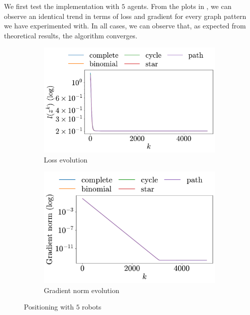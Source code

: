 \documentclass[a4paper,11pt,oneside]{book}
\begin{document}
We first test the implementation with $5$ agents. From the plots in , we can observe an identical trend in terms of loss and gradient for every graph pattern we have experimented with. In all cases, we can observe that, as expected from theoretical results, the algorithm converges.

\begin{figure}[h!]
      \centering
      \begin{subfigure}[h]{0.4\linewidth}
            \centering
            \includegraphics[width=\linewidth]{./figs/aggregative/few_agents/loss.pdf} 
            \caption{Loss evolution}
      \end{subfigure}
      \hfill
      \begin{subfigure}[h]{0.4\linewidth}
            \centering
            \includegraphics[width=\linewidth]{./figs/aggregative/few_agents/gradient.pdf} 
            \caption{Gradient norm evolution}
      \end{subfigure}
      \caption{Positioning with $5$ robots}
      \label{fig:positioning_5}
\end{figure}
\end{document}
